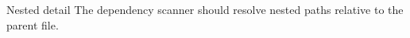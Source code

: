 \begin{alertblock}{Nested detail}
The dependency scanner should resolve nested \texttt{\string} paths relative to the parent file.
\end{alertblock}